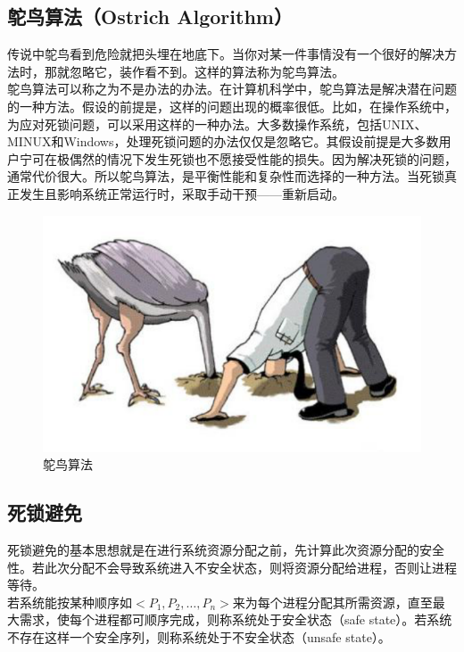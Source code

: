 \subsection{鸵鸟算法（Ostrich Algorithm）}

传说中鸵鸟看到危险就把头埋在地底下。当你对某一件事情没有一个很好的解决方法时，那就忽略它，装作看不到。这样的算法称为鸵鸟算法。 \\

鸵鸟算法可以称之为不是办法的办法。在计算机科学中，鸵鸟算法是解决潜在问题的一种方法。假设的前提是，这样的问题出现的概率很低。比如，在操作系统中，为应对死锁问题，可以采用这样的一种办法。大多数操作系统，包括UNIX、MINUX和Windows，处理死锁问题的办法仅仅是忽略它。其假设前提是大多数用户宁可在极偶然的情况下发生死锁也不愿接受性能的损失。因为解决死锁的问题，通常代价很大。所以鸵鸟算法，是平衡性能和复杂性而选择的一种方法。当死锁真正发生且影响系统正常运行时，采取手动干预——重新启动。

\begin{figure}[H]
	\centering
	\includegraphics[scale=0.6]{img/C2/2-9/1.png}
	\caption{鸵鸟算法}
\end{figure}

\subsection{死锁避免}

死锁避免的基本思想就是在进行系统资源分配之前，先计算此次资源分配的安全性。若此次分配不会导致系统进入不安全状态，则将资源分配给进程，否则让进程等待。 \\

若系统能按某种顺序如$ <P_1, P_2, \dots, P_n> $来为每个进程分配其所需资源，直至最大需求，使每个进程都可顺序完成，则称系统处于安全状态（safe state）。若系统不存在这样一个安全序列，则称系统处于不安全状态（unsafe state）。 \\

